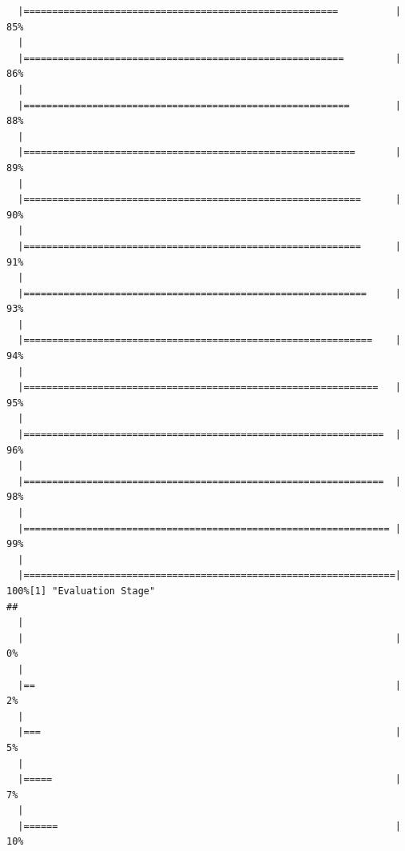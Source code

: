 \documentclass[]{article}
\begin{document}
\begin{verbatim}
  |=======================================================          |  85%
  |                                                                       
  |========================================================         |  86%
  |                                                                       
  |=========================================================        |  88%
  |                                                                       
  |==========================================================       |  89%
  |                                                                       
  |===========================================================      |  90%
  |                                                                       
  |===========================================================      |  91%
  |                                                                       
  |============================================================     |  93%
  |                                                                       
  |=============================================================    |  94%
  |                                                                       
  |==============================================================   |  95%
  |                                                                       
  |===============================================================  |  96%
  |                                                                       
  |===============================================================  |  98%
  |                                                                       
  |================================================================ |  99%
  |                                                                       
  |=================================================================| 100%[1] "Evaluation Stage"
## 
  |                                                                       
  |                                                                 |   0%
  |                                                                       
  |==                                                               |   2%
  |                                                                       
  |===                                                              |   5%
  |                                                                       
  |=====                                                            |   7%
  |                                                                       
  |======                                                           |  10%

\end{verbatim}
\end{document}
